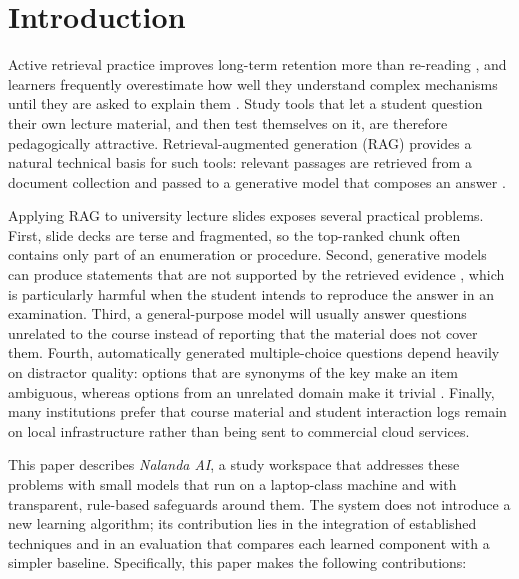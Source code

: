\documentclass[conference]{IEEEtran}
\begin{document}
\section{Introduction}
Active retrieval practice improves long-term retention more than re-reading \cite{roediger2006}, and learners frequently overestimate how well they understand complex mechanisms until they are asked to explain them \cite{rozenblit2002}. Study tools that let a student question their own lecture material, and then test themselves on it, are therefore pedagogically attractive. Retrieval-augmented generation (RAG) provides a natural technical basis for such tools: relevant passages are retrieved from a document collection and passed to a generative model that composes an answer \cite{lewis2020,gao2023}.

Applying RAG to university lecture slides exposes several practical problems. First, slide decks are terse and fragmented, so the top-ranked chunk often contains only part of an enumeration or procedure. Second, generative models can produce statements that are not supported by the retrieved evidence \cite{maynez2020,ji2023}, which is particularly harmful when the student intends to reproduce the answer in an examination. Third, a general-purpose model will usually answer questions unrelated to the course instead of reporting that the material does not cover them. Fourth, automatically generated multiple-choice questions depend heavily on distractor quality: options that are synonyms of the key make an item ambiguous, whereas options from an unrelated domain make it trivial \cite{mitkov2003,kurdi2020}. Finally, many institutions prefer that course material and student interaction logs remain on local infrastructure rather than being sent to commercial cloud services.

This paper describes \emph{Nalanda AI}, a study workspace that addresses these problems with small models that run on a laptop-class machine and with transparent, rule-based safeguards around them. The system does not introduce a new learning algorithm; its contribution lies in the integration of established techniques and in an evaluation that compares each learned component with a simpler baseline. Specifically, this paper makes the following contributions:
\end{document}

